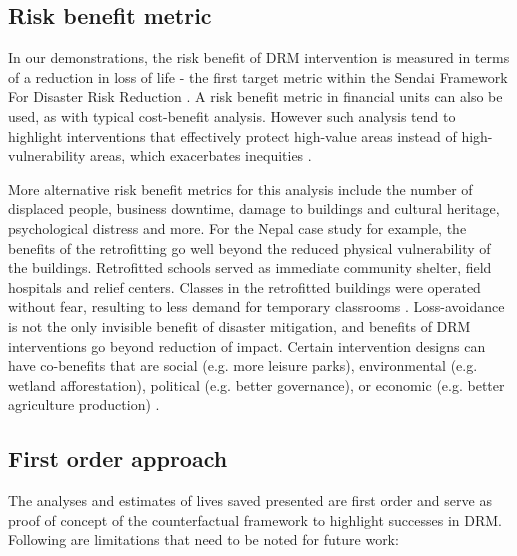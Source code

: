 \documentclass[utf8]{frontiersSCNS} %
\begin{document}
\subsection{Risk benefit metric}
In our demonstrations, the risk benefit of DRM intervention is measured in terms of a reduction in loss of life - the first target metric within the Sendai Framework For Disaster Risk Reduction \citep{united2015sendai}. A risk benefit metric in financial units can also be used, as with typical cost-benefit analysis. However such analysis tend to highlight interventions that effectively protect high-value areas instead of high-vulnerability areas, which exacerbates inequities \citep{markhvida_quantification_2020, lallemant2020informatics}. 

More alternative risk benefit metrics for this analysis include the number of displaced people, business downtime, damage to buildings and cultural heritage, psychological distress and more. For the Nepal case study for example, the benefits of the retrofitting go well beyond the reduced physical vulnerability of the buildings. Retrofitted schools served as immediate community shelter, field hospitals and relief centers. Classes in the retrofitted buildings were operated without fear, resulting to less demand for temporary classrooms \citep{marasini2020}. Loss-avoidance is not the only invisible benefit of disaster mitigation, and benefits of DRM interventions go beyond reduction of impact. Certain intervention designs can have co-benefits that are social (e.g. more leisure parks), environmental (e.g. wetland afforestation), political (e.g. better governance), or economic (e.g. better agriculture production) \citep{Tanner2015}.

\subsection{First order approach}

The analyses and estimates of lives saved presented are first order and serve as proof of concept of the counterfactual framework to highlight successes in DRM. Following are limitations that need to be noted for future work:
\end{document}
